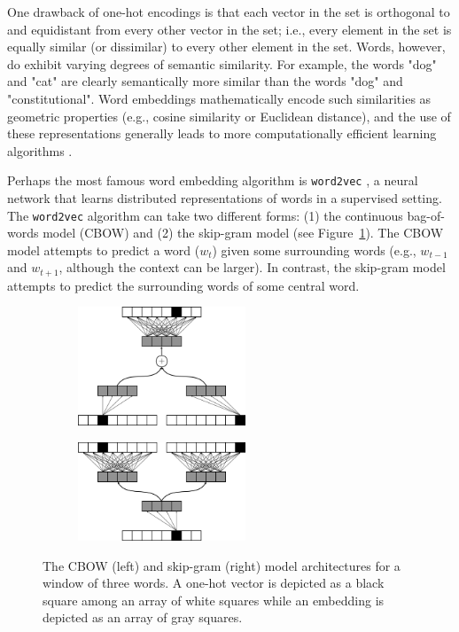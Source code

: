 \documentclass{article}
\begin{document}
One drawback of one-hot encodings is that each vector in the set is orthogonal to and equidistant from every other vector in the set; i.e., every element in the set is equally similar (or dissimilar) to every other element in the set. Words, however, do exhibit varying degrees of semantic similarity. For example, the words "dog" and "cat" are clearly semantically more similar than the words "dog" and "constitutional". Word embeddings mathematically encode such similarities as geometric properties (e.g., cosine similarity or Euclidean distance), and the use of these representations generally leads to more computationally efficient learning algorithms \parencite{Bengio2003}.

Perhaps the most famous word embedding algorithm is \texttt{word2vec} \parencite{Mikolov2013}, a neural network that learns distributed representations of words in a supervised setting. The \texttt{word2vec} algorithm can take two different forms: (1) the continuous bag-of-words model (CBOW) and (2) the skip-gram model (see Figure~\ref{fig:word2vec}). The CBOW model attempts to predict a word ($w_t$) given some surrounding words (e.g., $w_{t-1}$ and $w_{t+1}$, although the context can be larger). In contrast, the skip-gram model attempts to predict the surrounding words of some central word.

\begin{figure}
\captionsetup[subfigure]{labelformat=empty}
\centering

    \begin{subfigure}[t]{0.45\textwidth}
    \centering
    \includegraphics[width=5cm]{cbow_fig.png}
    \caption{}
    \end{subfigure}%
    \begin{subfigure}[t]{0.45\textwidth}
    \centering
    \includegraphics[width=5cm]{skip_gram.png}
    \caption{}
    \end{subfigure}

\caption{The CBOW (left) and skip-gram (right) model architectures for a window of three words. A one-hot vector is depicted as a black square among an array of white squares while an embedding is depicted as an array of gray squares.}
\label{fig:word2vec}
\end{figure}
\end{document}
